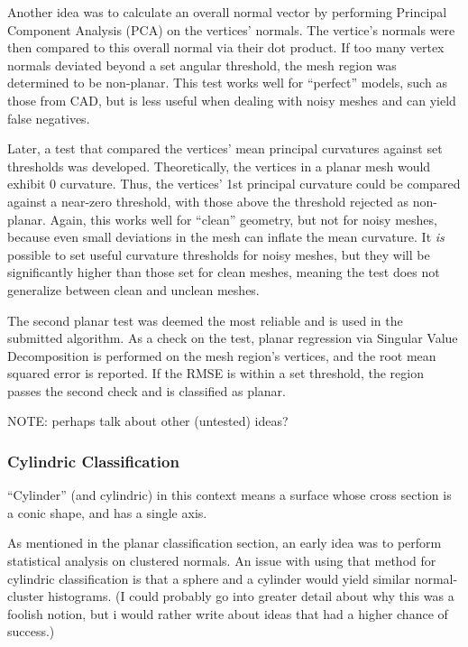 Another idea was to calculate an overall normal vector by performing Principal Component Analysis (PCA) on the vertices' normals.
The vertice's normals were then compared to this overall normal via their dot product.
If too many vertex normals deviated beyond a set angular threshold, the mesh region was determined to be non-planar.
This test works well for ``perfect'' models, such as those from CAD, but is less useful when dealing with noisy meshes and can yield false negatives.

Later, a test that compared the vertices' mean principal curvatures against set thresholds was developed.
Theoretically, the vertices in a planar mesh would exhibit 0 curvature.
Thus, the vertices' 1st principal curvature could be compared against a near-zero threshold, with those above the threshold rejected as non-planar.
Again, this works well for ``clean'' geometry, but not for noisy meshes, because even small deviations in the mesh can inflate the mean curvature.
It \textit{is} possible to set useful curvature thresholds for noisy meshes, but they will be significantly higher than those set for clean meshes, meaning the test does not generalize between clean and unclean meshes.

The second planar test was deemed the most reliable and is used in the submitted algorithm.
As a check on the test, planar regression via Singular Value Decomposition is performed on the mesh region's vertices, and the root mean squared error is reported.
If the RMSE is within a set threshold, the region passes the second check and is classified as planar.

NOTE: perhaps talk about other (untested) ideas?

\subsubsection{Cylindric Classification}
``Cylinder'' (and cylindric) in this context means a surface whose cross section is a conic shape, and has a single axis.

As mentioned in the planar classification section, an early idea was to perform statistical analysis on clustered normals.
An issue with using that method for cylindric classification is that a sphere and a cylinder would yield similar normal-cluster histograms.
(I could probably go into greater detail about why this was a foolish notion, but i would rather write about ideas that had a higher chance of success.)

